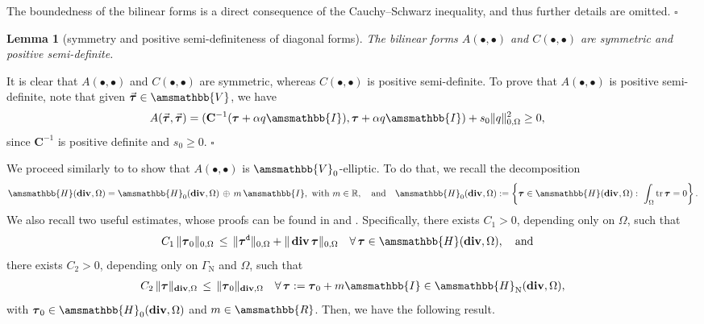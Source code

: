 \documentclass[fleqn,a4paper]{cas-sc}
\newcommand\qan{\quad\hbox{and}\quad}
\newcommand\bdiv{\mathop{\mathbf{div}}\nolimits}
\newcommand\tr{\mathop{\mathrm{tr}}\nolimits}
\newcommand{\bC}{\mathbf{C}}
\newcommand{\bbR}{\amsmathbb{R}}
\newcommand{\Om}{\Omega}
\newcommand{\0}{\boldsymbol{0}}
\newcommand\bbV{\amsmathbb{V}}
\newcommand\bbH{\amsmathbb{H}}
\newcommand\bbI{\amsmathbb{I}}
\newcommand\btau{\boldsymbol{\tau}}
\numberwithin{equation}{section}
\numberwithin{figure}{section}
\newtheorem{lemma}[theorem]{Lemma}
\newenvironment{proof}{\noindent{\it Proof.}}{\hfill$\square$}
\begin{document}
\begin{proof}
The boundedness of the bilinear forms is a direct consequence of the Cauchy--Schwarz inequality, and thus further details are omitted.
\end{proof}

\begin{lemma}[symmetry and positive semi-definiteness of diagonal forms]\label{lemma:positive-definite-diagonal}
The bilinear forms $A(\bullet,\bullet)$ and  $C(\bullet,\bullet)$ are symmetric and positive semi-definite.
\end{lemma}
\begin{proof}
  It is clear that $A(\bullet,\bullet)$ and $C(\bullet,\bullet)$  are symmetric, {whereas}   $C(\bullet,\bullet)$ is positive semi-definite. To prove that $A(\bullet,\bullet)$ is positive semi-definite,  note that given $\vec{\btau} \in \bbV$, we have
\begin{align}\label{positive-A}
A(\vec{\btau}, \vec{\btau}) &= (\bC^{-1}(\btau+\alpha q\bbI), \btau+\alpha q\bbI)+s_0\|q\|^{2}_{0,\Om} \geq 0,
\end{align}
since $\bC^{-1}$ is {positive definite} and $s_{0}\geq0$.
\end{proof}

We proceed similarly to \cite[Section 2.3]{gatica2006priori} to show that $A(\bullet,\bullet)$ is $\bbV_{0}$-elliptic. To do that, we recall the decomposition
\begin{equation*}%
 \bbH(\bdiv_{},\Omega)  = \bbH_0(\bdiv_{},\Omega) \, \oplus \, {m \,\bbI}, \hbox{ with }{m\in \mathbb{R}}, \quad \text{and} \quad 
  \bbH_0(\bdiv_{},\Omega)  := \left\{\btau \in \bbH(\bdiv_{},\Omega):\ \int_{\Omega}\tr\btau = 0\right\}.
\end{equation*}
We also recall two useful estimates, whose proofs can be found in \cite[Lemma 2.3]{gatica2006priori} and \cite[Lemma 2.4]{gatica2006priori}. Specifically, there exists $C_{1}>0$, depending only on $\Omega$, such that 
\begin{equation}\label{DES}
   C_{1} \,\|\btau_{0}\|_{0,\Omega} \, \leq \, \| \btau^{\tt d}\|_{0,\Omega} + \| \bdiv \btau\|_{0,\Omega} \quad \forall \, \btau \in \bbH(\bdiv,\Omega), \qan
\end{equation}
 there exists $C_{2}>0$, depending only on $\Gamma_{\mathrm{N}}$ and $\Omega$, such that 
\begin{align}\label{DES-GN}
    C_{2} \, \|\btau \|_{\bdiv,\Omega}  \,\leq \,   \|\btau_{0}\|_{\bdiv,\Omega}  \quad \forall \, \btau:= \btau_{0}+ {m} \bbI \in   \bbH_{\mathrm{N}}(\bdiv,\Omega),
\end{align}
with $\btau_{0} \in \bbH_{0}(\bdiv,\Omega)$ and $m  \in \bbR$. Then, we have the following result.
\end{document}
